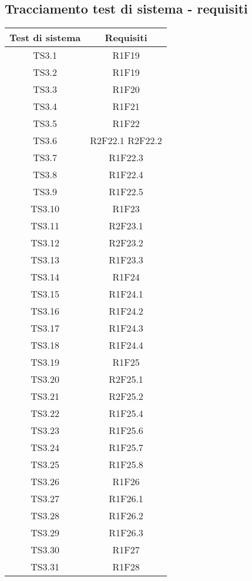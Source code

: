 \subsection{Tracciamento test di sistema - requisiti}

\begin{center}
	\begin{longtable}{|c|c|}
	\hline
	\rowcolor{lighter-grayer}
	\textbf{Test di sistema} & \textbf{Requisiti} \\
	\hline
	\endfirsthead


	
	\hline
	TS3.1 &  R1F19 \\
	TS3.2 &  R1F19 \\
	TS3.3 &  R1F20 \\
	TS3.4 &  R1F21 \\
	TS3.5 &  R1F22 \\
	TS3.6 &  R2F22.1 R2F22.2 \\
	TS3.7 &  R1F22.3 \\
	TS3.8 &  R1F22.4 \\
	TS3.9 &  R1F22.5 \\
	TS3.10 & R1F23 \\
	TS3.11 & R2F23.1 \\
	TS3.12 & R2F23.2 \\
	TS3.13 & R1F23.3 \\
	TS3.14 & R1F24 \\
	TS3.15 & R1F24.1 \\
	TS3.16 & R1F24.2 \\
	TS3.17 & R1F24.3 \\
	TS3.18 & R1F24.4 \\
	TS3.19 & R1F25 \\
	TS3.20 & R2F25.1 \\
	TS3.21 & R2F25.2 \\
	TS3.22 & R1F25.4 \\
	TS3.23 & R1F25.6 \\
	TS3.24 & R1F25.7 \\
	TS3.25 & R1F25.8 \\
	TS3.26 & R1F26 \\
	TS3.27 & R1F26.1 \\
	TS3.28 & R1F26.2 \\
	TS3.29 & R1F26.3  \\
	TS3.30 & R1F27 \\
	TS3.31 & R1F28 \\
	

	\hline

	\end{longtable}
\end{center}

